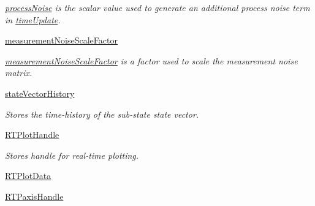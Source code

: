 \begin{DoxyCompactItemize}
\begin{DoxyCompactList}\small\item\em \hyperlink{classmodest_1_1substates_1_1correlationvector_1_1CorrelationVector_ab1756128cdec161ea22557d756745195}{process\+Noise} is the scalar value used to generate an additional process noise term in \hyperlink{classmodest_1_1substates_1_1correlationvector_1_1CorrelationVector_a59c13e5fa26ba27717494f687ec78ef8}{time\+Update}. \end{DoxyCompactList}\item 
\hyperlink{classmodest_1_1substates_1_1correlationvector_1_1CorrelationVector_ae1c71753aea17170b58bd9fabc62c037}{measurement\+Noise\+Scale\+Factor}
\begin{DoxyCompactList}\small\item\em \hyperlink{classmodest_1_1substates_1_1correlationvector_1_1CorrelationVector_ae1c71753aea17170b58bd9fabc62c037}{measurement\+Noise\+Scale\+Factor} is a factor used to scale the measurement noise matrix. \end{DoxyCompactList}\item 
\hyperlink{classmodest_1_1substates_1_1substate_1_1SubState_a38c12c9d0899bc1161f3502b584517a2}{state\+Vector\+History}
\begin{DoxyCompactList}\small\item\em Stores the time-\/history of the sub-\/state state vector. \end{DoxyCompactList}\item 
\hyperlink{classmodest_1_1substates_1_1substate_1_1SubState_a37ded775b84cea85b4dce0f1b16286c4}{R\+T\+Plot\+Handle}
\begin{DoxyCompactList}\small\item\em Stores handle for real-\/time plotting. \end{DoxyCompactList}\item 
\hyperlink{classmodest_1_1substates_1_1substate_1_1SubState_a9fefae1facc797a1132fb61a55e9ffa1}{R\+T\+Plot\+Data}
\item 
\hyperlink{classmodest_1_1substates_1_1substate_1_1SubState_a497ccbb6658589b02568e87c6382222e}{R\+T\+Paxis\+Handle}
\end{DoxyCompactItemize}
